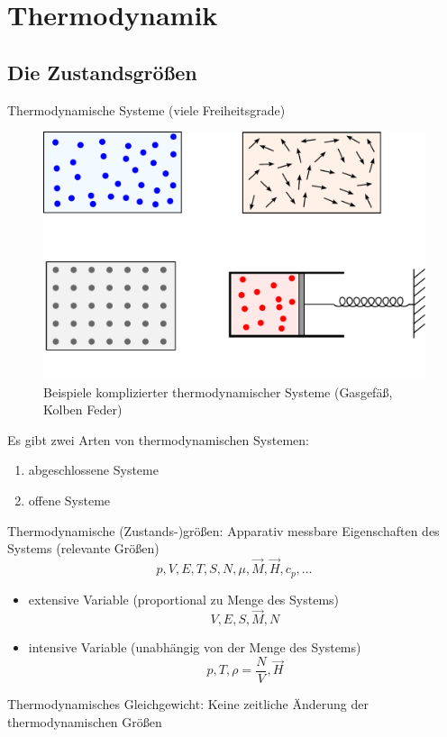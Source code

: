 \section{Thermodynamik}
\subsection{Die Zustandsgrößen}
Thermodynamische Systeme (viele Freiheitsgrade)
\begin{figure}[H]
    \begin{center}
        \includegraphics[width=\textwidth]{../img/exampleSystems.pdf}
        \caption{Beispiele komplizierter thermodynamischer Systeme (Gasgefäß, Kolben Feder)}
        \label{img:exampleSystems}
    \end{center}
\end{figure}
Es gibt zwei Arten von thermodynamischen Systemen:
\begin{enumerate}
    \item abgeschlossene Systeme
    \item offene Systeme
\end{enumerate}
Thermodynamische (Zustands-)größen:
Apparativ messbare Eigenschaften des Systems (relevante Größen)
\begin{equation}
    p, V, E, T, S, N, \mu, \vec{M}, \vec{H}, c_p, \ldots
\end{equation}
\begin{itemize}
    \item extensive Variable (proportional zu Menge des Systems)
    \begin{equation}
        V, E, S, \vec{M}, N
    \end{equation}
    \item intensive Variable (unabhängig von der Menge des Systems)
    \begin{equation}
        p, T, \rho=\frac{N}{V}, \vec{H}
    \end{equation}
\end{itemize}
Thermodynamisches Gleichgewicht: Keine zeitliche Änderung der thermodynamischen Größen
